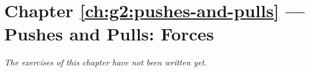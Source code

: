 \section*{Chapter \ref{ch:g2:pushes-and-pulls} --- Pushes and Pulls: Forces}


\emph{The exercises of this chapter have not been written yet.}
